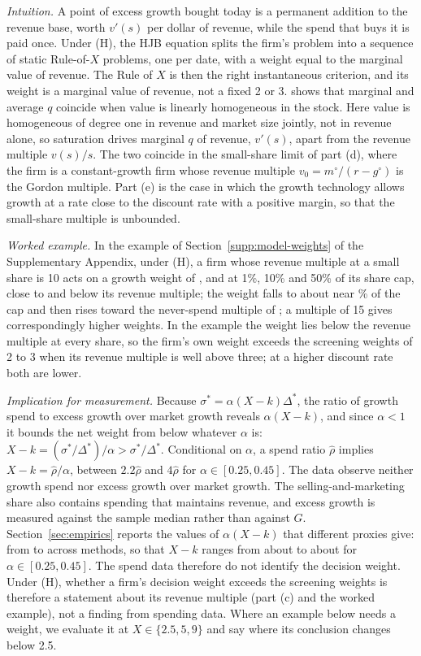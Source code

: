 \noindent\emph{Intuition.} A point of excess growth bought today is a permanent addition to the revenue base, worth $v'(s)$ per dollar of revenue, while the spend that buys it is paid once. Under (H), the HJB equation splits the firm's problem into a sequence of static Rule-of-$X$ problems, one per date, with a weight equal to the marginal value of revenue. The Rule of $X$ is then the right instantaneous criterion, and its weight is a marginal value of revenue, not a fixed 2 or 3. \citet{hayashi1982tobin} shows that marginal and average $q$ coincide when value is linearly homogeneous in the stock. Here value is homogeneous of degree one in revenue and market size jointly, not in revenue alone, so saturation drives marginal $q$ of revenue, $v'(s)$, apart from the revenue multiple $v(s)/s$. The two coincide in the small-share limit of part (d), where the firm is a constant-growth firm whose revenue multiple $v_0=m^\circ/(r-g^\circ)$ is the Gordon multiple. Part (e) is the case in which the growth technology allows growth at a rate close to the discount rate with a positive margin, so that the small-share multiple is unbounded.

\noindent\emph{Worked example.} In the example of Section~\ref{supp:model-weights} of the Supplementary Appendix, under (H), a firm whose revenue multiple at a small share is 10 acts on a growth weight of \VpOnePct, \VpTenPct{} and \VpFiftyPct{} at 1\%, 10\% and 50\% of its share cap, close to and below its revenue multiple; the weight falls to about \VpMin{} near \VpMinAt\% of the cap and then rises toward the never-spend multiple of \VpLimit; a multiple of 15 gives correspondingly higher weights. In the example the weight lies below the revenue multiple at every share, so the firm's own weight exceeds the screening weights of 2 to 3 when its revenue multiple is well above three; at a higher discount rate both are lower.

\noindent\emph{Implication for measurement.} Because $\sigma^*=\alpha(X-k)\Delta^*$, the ratio of growth spend to excess growth over market growth reveals $\alpha(X-k)$, and since $\alpha<1$ it bounds the net weight from below whatever $\alpha$ is: $X-k=(\sigma^*/\Delta^*)/\alpha>\sigma^*/\Delta^*$. Conditional on $\alpha$, a spend ratio $\hat\rho$ implies $X-k=\hat\rho/\alpha$, between $2.2\hat\rho$ and $4\hat\rho$ for $\alpha\in[0.25,0.45]$. The data observe neither growth spend nor excess growth over market growth. The selling-and-marketing share also contains spending that maintains revenue, and excess growth is measured against the sample median rather than against $G$. Section~\ref{sec:empirics} reports the values of $\alpha(X-k)$ that different proxies give: from \AlphaAllLo{} to \AlphaAllHi{} across methods, so that $X-k$ ranges from about \XkLo{} to about \XkHi{} for $\alpha\in[0.25,0.45]$. The spend data therefore do not identify the decision weight. Under (H), whether a firm's decision weight exceeds the screening weights is therefore a statement about its revenue multiple (part (c) and the worked example), not a finding from spending data. Where an example below needs a weight, we evaluate it at $X\in\{2.5,5,9\}$ and say where its conclusion changes below 2.5.

